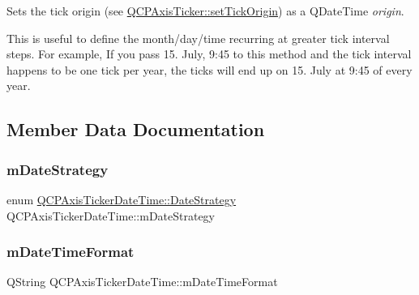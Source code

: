 Sets the tick origin (see \hyperlink{class_q_c_p_axis_ticker_ab509c7e500293bf66a8409f0d7c23943}{Q\+C\+P\+Axis\+Ticker\+::set\+Tick\+Origin}) as a Q\+Date\+Time {\itshape origin}.

This is useful to define the month/day/time recurring at greater tick interval steps. For example, If you pass 15. July, 9\+:45 to this method and the tick interval happens to be one tick per year, the ticks will end up on 15. July at 9\+:45 of every year. 

\subsection{Member Data Documentation}
\mbox{\label{class_q_c_p_axis_ticker_date_time_a93fca912446ca341bee277cb2cc84e49}} 
\subsubsection{\texorpdfstring{m\+Date\+Strategy}{mDateStrategy}}
{\footnotesize\ttfamily enum \hyperlink{class_q_c_p_axis_ticker_date_time_af2c7c60821a6234ca7a172f42ef7f1d8}{Q\+C\+P\+Axis\+Ticker\+Date\+Time\+::\+Date\+Strategy}  Q\+C\+P\+Axis\+Ticker\+Date\+Time\+::m\+Date\+Strategy\hspace{0.3cm}{\ttfamily [protected]}}

\mbox{\label{class_q_c_p_axis_ticker_date_time_adbbb25add598377998c0c57dbd29adaf}} 
\subsubsection{\texorpdfstring{m\+Date\+Time\+Format}{mDateTimeFormat}}
{\footnotesize\ttfamily Q\+String Q\+C\+P\+Axis\+Ticker\+Date\+Time\+::m\+Date\+Time\+Format\hspace{0.3cm}{\ttfamily [protected]}}

\mbox{\label{class_q_c_p_axis_ticker_date_time_a5f5abe83c371f13eb3415585e638dba9}} 
